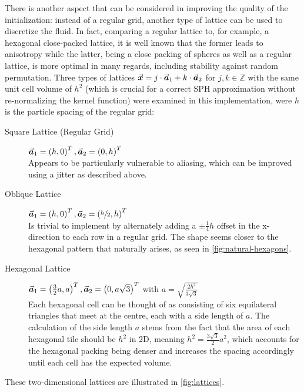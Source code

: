 There is another aspect that can be considered in improving the quality of the initialization: instead of a regular grid, another type of lattice can be used to discretize the fluid. In fact, comparing a regular lattice to, for example, a hexagonal close-packed lattice, it is well known that the former leads to anisotropy while the latter, being a close packing of spheres as well as a regular lattice, is more optimal in many regards, including stability against random permutation\autocite*{initialization-lattices-optimal-initial}. Three types of lattices $\vec{\bm{x}} = j\cdot\vec{\bm{a}}_1 + k\cdot\vec{\bm{a}}_2$ for $j,k\in\mathds{Z}$ with the same unit cell volume of $h^2$ (which is crucial for a correct SPH approximation without re-normalizing the kernel function) were examined in this implementation, were $h$ is the particle spacing of the regular grid:
\begin{description}
  \item[Square Lattice (Regular Grid)] $\vec{\bm{a}}_1 = \left(h,0\right)^T, \vec{\bm{a}}_2 = \left(0,h\right)^T$\\
        Appears to be particularly vulnerable to aliasing, which can be improved using a jitter as described above.
  \item[Oblique Lattice] $\vec{\bm{a}}_1 = \left(h,0\right)^T, \vec{\bm{a}}_2 = \left(\sfrac{h}{2},h\right)^T$\\
        Is trivial to implement by alternately adding a $\pm\frac{1}{4}h$ offset in the x-direction to each row in a regular grid. The shape seems closer to the hexagonal pattern that naturally arises, as seen in \autoref{fig:natural-hexagons}.
  \item[Hexagonal Lattice] $\vec{\bm{a}}_1 = \left(\frac{3}{2}a,a\right)^T, \vec{\bm{a}}_2 = \left(0,a\sqrt{3}\right)^T$ with $a = \sqrt{\frac{2h^2}{3\sqrt{3}}}$\\
        Each hexagonal cell can be thought of as consisting of six equilateral triangles that meet at the centre, each with a side length of $a$. The calculation of the side length $a$ stems from the fact that the area of each hexagonal tile should be $h^2$ in 2D, meaning $h^2 = \frac{3\sqrt{3}}{2}a^2$, which accounts for the hexagonal packing being denser and increases the spacing accordingly until each cell has the expected volume.
\end{description}
These two-dimensional lattices are illustrated in \autoref{fig:lattices}.

